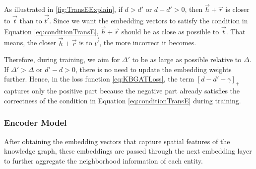 As illustrated in \autoref{fig:TransEExplain}, if $d > d'$ or $d - d' > 0$, then $\overrightarrow{h} + \overrightarrow{r}$ is closer to $\overrightarrow{t}$ than to $\overrightarrow{t'}$. Since we want the embedding vectors to satisfy the condition in Equation \ref{eq:conditionTransE}, $\overrightarrow{h} + \overrightarrow{r}$ should be as close as possible to $\overrightarrow{t}$. That means, the closer $\overrightarrow{h} + \overrightarrow{r}$ is to $\overrightarrow{t'}$, the more incorrect it becomes.

Therefore, during training, we aim for $\Delta'$ to be as large as possible relative to $\Delta$. If $\Delta' > \Delta$ or $d' - d > 0$, there is no need to update the embedding weights further. Hence, in the loss function \ref{eq:KBGATLoss}, the term $[d - d' + \gamma]_{+}$ captures only the positive part because the negative part already satisfies the correctness of the condition in Equation \ref{eq:conditionTransE} during training.



\subsubsection{Encoder Model}
\label{sec:encodeKBGAT}

After obtaining the embedding vectors that capture spatial features of the knowledge graph, these embeddings are passed through the next embedding layer to further aggregate the neighborhood information of each entity.


